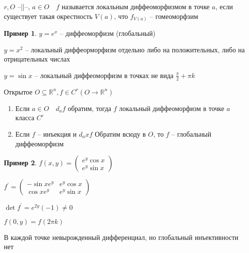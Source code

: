 \documentclass{book}
\newcommand\R{\ensuremath{\mathbb{R}}}
\newcommand{\p}[1]{#1^{\prime}}
\theoremstyle{definition}
\newtheorem*{example}{Пример}
\begin{document}
        \begin{definition}
            $r, O$ --||--,  $a\in O\quad f$ называется локальным диффеоморфизмом в точке $ a$, если существует такая окрестность $V(a)$, что  $f_{V(a)}$ -- гомеоморфзим
        \end{definition}

        \begin{example}
            $y = e^x$ -- диффеоморфизм (глобальный)

             $y = x^2$ -- локальный диффеорморфизм отдельно либо на положительных, либо на отрицательных числах

             $y = \sin x$ -- локальный диффеоморфизм в точках не вида  $\frac{\pi}{2} + \pi k$
        \end{example}

        \begin{theorem}

            Открытое $O\subseteq \R^n, f\in C^r\left( O\to \R^n \right) $
            \begin{enumerate}
                \item Если $a\in O\quad d_af$ обратим, тогда  $f$ локальный диффеоморфизм в точке  $a$ класса  $C^r$\
               \item Если $f$ -- инъекция и  $d_axf$ Обратим всюду в  $O$, то  $f$ -- глобальный диффеоморфизм
            \end{enumerate}
        \end{theorem}

        \begin{example}
            $f(x,y) = \begin{pmatrix} e^y\cos x\\ e^y\sin  x \end{pmatrix} $ 

            $\p f = \begin{pmatrix} -\sin x e^y & e^y\cos x\\
            \cos x e^y & e^y\sin x\end{pmatrix} $

            $\det \p f = e^{2y}(-1)\neq 0$

            $f(0,y) = f(2\pi k)$

            В каждой точке невырожденный дифференциал, но глобальный инъективности нет
        \end{example}
\end{document}
